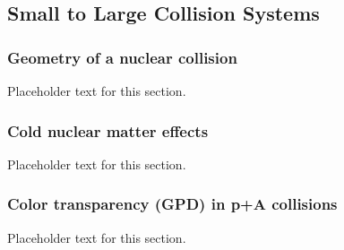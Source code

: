 \subsection{Small to Large Collision Systems}
\subsubsection{Geometry of a nuclear collision}
Placeholder text for this section.

\subsubsection{Cold nuclear matter effects}
Placeholder text for this section.

\subsubsection{Color transparency (GPD) in p+A collisions}
Placeholder text for this section.

